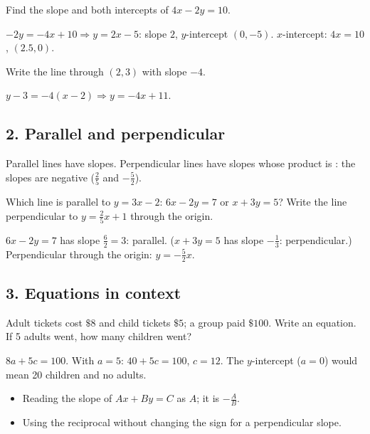 Find the slope and both intercepts of $4x-2y=10$.
\begin{workspace}[2cm]
$-2y=-4x+10 \Rightarrow y=2x-5$: slope $2$, $y$-intercept $(0,-5)$. $x$-intercept: $4x=10$, $(2.5,0)$.
\end{workspace}

Write the line through $(2,3)$ with slope $-4$.
\begin{workspace}[1.8cm]
$y-3=-4(x-2) \Rightarrow y=-4x+11$.
\end{workspace}

\subsection*{2. Parallel and perpendicular}
\begin{keyidea}
Parallel lines have  slopes. Perpendicular lines have slopes whose product is : the slopes are negative  ($\frac25$ and $-\frac52$).
\end{keyidea}

Which line is parallel to $y=3x-2$: $6x-2y=7$ or $x+3y=5$? Write the line perpendicular to $y=\frac25x+1$ through the origin.
\begin{workspace}[2.2cm]
$6x-2y=7$ has slope $\frac{6}{2}=3$: parallel. ($x+3y=5$ has slope $-\frac13$: perpendicular.) Perpendicular through the origin: $y=-\frac52x$.
\end{workspace}

\subsection*{3. Equations in context}
Adult tickets cost $\$8$ and child tickets $\$5$; a group paid $\$100$. Write an equation. If 5 adults went, how many children went?
\begin{workspace}[2.2cm]
$8a+5c=100$. With $a=5$: $40+5c=100$, $c=12$. The $y$-intercept ($a=0$) would mean 20 children and no adults.
\end{workspace}

\begin{mistakes}
\begin{itemize}
\item Reading the slope of $Ax+By=C$ as $A$; it is $-\frac AB$.
\item Using the reciprocal without changing the sign for a perpendicular slope.
\end{itemize}
\end{mistakes}

